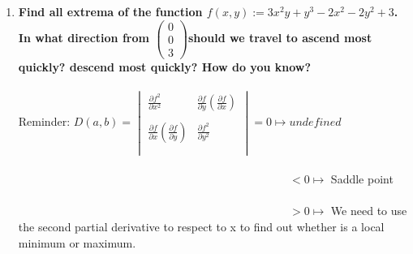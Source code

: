 \documentclass{article}
\begin{document}
\begin{enumerate}[14.]
	\item\textbf{Find all extrema of the 
	      function $f(x,y) := 3x^{2}y+y^{3}-2x^{2}-2y^{2}+3$. In what direction from $\left(\!\begin{array}{c} 0 \\ 0 \\ 3 \end{array} \!\right)$should we travel to ascend most quickly? descend most quickly? How do you know?}\\
	\\
	Reminder: $D(a,b)= \begin{vmatrix}
	\frac{\partial{f^{2}}}{\partial{x^{2}}}&\frac{\partial{f}}{\partial{y}}(\frac{\partial{f}}{\partial{x}})\\\\
	\frac{\partial{f}}{\partial{x}}(\frac{\partial{f}}{\partial{y}})&\frac{\partial{f^{2}}}{\partial{y^{2}}}\\\\
	\end{vmatrix} = 0 \mapsto  undefined$ \\ 
	\\
	$\hspace{10cm}< 0\mapsto$ Saddle point\\
	\\
	$\hspace{10cm}> 0\mapsto$ We need to use the second partial derivative to respect to x to find out whether is a local minimum or maximum. \\
	\\
	

\end{enumerate}
\end{document}
